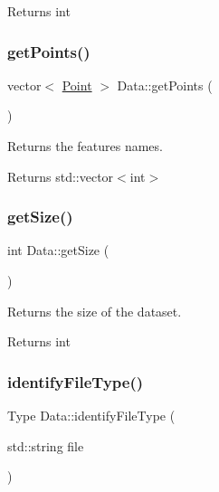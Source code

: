 \begin{DoxyReturn}{Returns}
int 
\end{DoxyReturn}
\mbox{\label{class_data_a8fe9ce813848765a7615b909c4654b55}} 
\subsubsection{\texorpdfstring{get\+Points()}{getPoints()}}
{\footnotesize\ttfamily vector$<$ \hyperlink{class_point}{Point} $>$ Data\+::get\+Points (\begin{DoxyParamCaption}{ }\end{DoxyParamCaption})}



Returns the features names. 

\begin{DoxyReturn}{Returns}
std\+::vector$<$int$>$ 
\end{DoxyReturn}
\mbox{\label{class_data_abfd7c7cca66a186ff45efa430bcb2f1e}} 
\subsubsection{\texorpdfstring{get\+Size()}{getSize()}}
{\footnotesize\ttfamily int Data\+::get\+Size (\begin{DoxyParamCaption}{ }\end{DoxyParamCaption})}



Returns the size of the dataset. 

\begin{DoxyReturn}{Returns}
int 
\end{DoxyReturn}
\mbox{\label{class_data_a80629b0e6a2516d17475c58e77dbae7d}} 
\subsubsection{\texorpdfstring{identify\+File\+Type()}{identifyFileType()}}
{\footnotesize\ttfamily Type Data\+::identify\+File\+Type (\begin{DoxyParamCaption}\item[{std\+::string}]{file }\end{DoxyParamCaption})}



